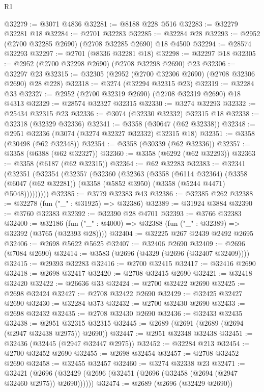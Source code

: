 \begin{lexlean}{R1}
\begin{coremodule}
@32279 := @3071 @4836
@32281 := @8188 @228 @516
@32283 := @32279 @32281 @18
@32284 := @2701 @32283
@32285 := @32284 @28
@32293 := @2952 (@2700 @32285 @2690) (@2708 @32285 @2690) @18 @4500
@32294 := @28574 @32293
@32297 := @2701 (@8336 @32281 @18)
@32298 := @32297 @18
@32305 := @2952 (@2700 @32298 @2690) (@2708 @32298 @2690) @23
@32306 := @32297 @23
@32315 := @32305 (@2952 (@2700 @32306 @2690) (@2708 @32306 @2690) @28 @228)
@32318 := @3274 (@32294 @32315 @23)
@32319 := @32284 @33
@32327 := @2952 (@2700 @32319 @2690) (@2708 @32319 @2690) @18 @4313
@32329 := @28574 @32327 @32315
@32330 := @3274 @32293
@32332 := @25434 @32315 @23
@32336 := @3074 (@32330 @32332) @32315 @18
@32338 := @32318 (@32329 @32336)
@32341 := @3358 (@30647 (@62 @32338))
@32348 := @2951 @32336 (@3074 (@3274 @32327 @32332) @32315 @18)
@32351 := @3358 (@30498 (@62 @32348))
@32354 := @3358 (@30339 (@62 @32336))
@32357 := @3358 (@6388 (@62 @32327))
@32360 := @3358 (@6292 (@62 @32293))
@32363 := @3358 (@6187 (@62 @32315))
@32364 := @62 @32283
@32383 := @32341
    (@32351
      (@32354
        (@32357
          (@32360
            (@32363
              (@3358
                (@6114 @32364)
                (@3358 (@6047 (@62 @32281)) (@3358 (@5852 @3950) (@3358 (@5244 @4471) @5048)))))))))
@32385 := @3779 @32383 @43
@32386 := @32385 @262
@32388 := @32278 (fun ("_" : @31925) => @32386)
@32389 := @31924 @3884
@32390 := @3760 @32383
@32392 := @32390 @28 @4701
@32393 := @3766 @32383
@32400 := @32186 (fun ("_" : @4000) => @32388 (fun ("_" : @32389) => @32392 (@3765 (@32393 @28))))
@32404 := @32225 @267 @2439 @2492 @2695
@32406 := @2698 @5622 @5625
@32407 := @32406 @2690
@32409 := @2696 (@7084 @2690)
@32414 := @3583 (@2696 (@4329 (@2696 (@32407 @32409))))
@32415 := @29393 @32283
@32416 := @2700 @32415
@32417 := @32416 @2690
@32418 := @2698 @32417
@32420 := @2708 @32415 @2690
@32421 := @32418 @32420
@32422 := @26636 @33
@32424 := @2700 @32422 @2690
@32425 := @2698 @32424
@32427 := @2708 @32422 @2690
@32429 := @32425 @32427 @2690
@32430 := @32284 @373
@32432 := @2700 @32430 @2690
@32433 := @2698 @32432
@32435 := @2708 @32430 @2690
@32436 := @32433 @32435
@32438 := @2951 @32315 @32315
@32445 := @2689 (@2691 (@2689 (@2694 (@2947 @32438 @2975)) @2690))
@32447 := @2951 @32348 @32438
@32451 := @32436 (@32445 (@2947 @32447 @2975))
@32452 := @32284 @213
@32454 := @2700 @32452 @2690
@32455 := @2698 @32454
@32457 := @2708 @32452 @2690
@32458 := @32455 @32457
@32460 := @3274 @32338 @23
@32471 := @32421
    (@2696 (@32429 (@2696 (@32451 (@2696 (@32458 (@2694 (@2947 @32460 @2975)) @2690))))))
@32474 := @2689 (@2696 (@32429 @2690))

\end{coremodule}
\end{lexlean}
